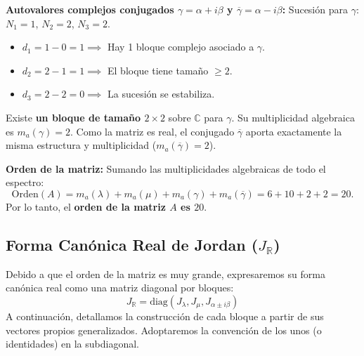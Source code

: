 {    \textbf{Autovalores complejos conjugados $\gamma = \alpha + i\beta$ y $\overline{\gamma} = \alpha - i\beta$:}
    Sucesión para $\gamma$: $N_1 = 1$, $N_2 = 2$, $N_3 = 2$.
    \begin{itemize}
        \item $d_1 = 1 - 0 = 1 \implies$ Hay 1 bloque complejo asociado a $\gamma$.
        \item $d_2 = 2 - 1 = 1 \implies$ El bloque tiene tamaño $\ge 2$.
        \item $d_3 = 2 - 2 = 0 \implies$ La sucesión se estabiliza.
    \end{itemize}
    Existe \textbf{un bloque de tamaño $2 \times 2$} sobre $\mathbb{C}$ para $\gamma$. Su multiplicidad algebraica es $m_a(\gamma) = 2$. Como la matriz es real, el conjugado $\overline{\gamma}$ aporta exactamente la misma estructura y multiplicidad ($m_a(\overline{\gamma}) = 2$).

    \textbf{Orden de la matriz:}
    Sumando las multiplicidades algebraicas de todo el espectro:
    \[
        \text{Orden}(A) = m_a(\lambda) + m_a(\mu) + m_a(\gamma) + m_a(\overline{\gamma}) = 6 + 10 + 2 + 2 = 20.
    \]
    Por lo tanto, el \textbf{orden de la matriz $A$ es $20$}.

    \subsection*{Forma Canónica Real de Jordan ($J_\mathbb{R}$)}

    Debido a que el orden de la matriz es muy grande, expresaremos su forma canónica real como una matriz diagonal por bloques:
    \[
        J_\mathbb{R} = \text{diag}(J_\lambda, J_\mu, J_{\alpha \pm i\beta})
    \]
    A continuación, detallamos la construcción de cada bloque a partir de sus vectores propios generalizados. Adoptaremos la convención de los unos (o identidades) en la subdiagonal.

}
